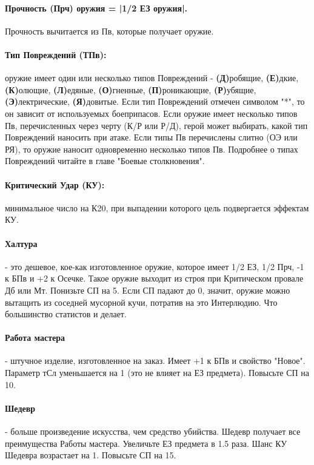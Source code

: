 \paragraph{Прочность (Прч) оружия = |1/2 ЕЗ оружия|.} Прочность вычитается из Пв, которые получает оружие.

\paragraph{Тип Повреждений (ТПв):} оружие имеет один или несколько типов Повреждений - \textbf{(Д)}робящие, \textbf{(Е)}дкие, \textbf{(К)}олющие, \textbf{(Л)}едяные, \textbf{(О)}гненные, \textbf{(П)}роникающие, \textbf{(Р)}убящие, \textbf{(Э)}лектрические, \textbf{(Я)}довитые.
\newline Если тип Повреждений отмечен символом "*", то он зависит от используемых боеприпасов.
\newline Если оружие имеет несколько типов Пв, перечисленных через черту (К/Р или Р/Д), герой может выбирать, какой тип Повреждений наносить при атаке. 
\newline Если типы Пв перечислены слитно (ОЭ или РЯ), то оружие наносит одновременно несколько типов Пв. 
\newline Подробнее о типах Повреждений читайте в главе "Боевые столкновения".

\paragraph{Критический Удар (КУ):} минимальное число на К20, при выпадении которого цель подвергается эффектам КУ. 

\paragraph{Халтура} - это дешевое, кое-как изготовленное оружие, которое имеет 1/2 ЕЗ, 1/2 Прч, -1 к БПв и +2 к Осечке. Такое оружие выходит из строя при Критическом провале Дб или Мт. Понизьте СП на 5. Если СП падают до 0, значит, оружие можно вытащить из соседней мусорной кучи, потратив на это Интерлюдию. Что большинство статистов и делает.
\paragraph{Работа мастера} - штучное изделие, изготовленное на заказ. Имеет +1 к БПв и свойство "Новое". Параметр тСл уменьшается на 1 (это не влияет на ЕЗ предмета). Повысьте СП на 10. 
\paragraph{Шедевр} - больше произведение искусства, чем средство убийства.  Шедевр получает все преимущества Работы мастера. Увеличьте ЕЗ предмета в 1.5 раза. Шанс КУ Шедевра возрастает на 1. Повысьте СП на 15.

